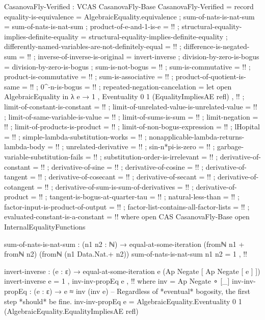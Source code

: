 \documentclass{report}
\begin{document}
\begin{code}
CasanovaFly-Verified : VCAS CasanovaFly-Base
CasanovaFly-Verified = record
  { equality-is-equivalence = AlgebraicEquality.equivalence
  ; sum-of-nats-is-nat-sum = sum-of-nats-is-nat-sum
  ; product-of-e-and-1-is-e = {!!}
  ; structural-equality-implies-definite-equality =
    structural-equality-implies-definite-equality
  ; differently-named-variables-are-not-definitely-equal = {!!}
  ; difference-is-negated-sum = {!!}
  ; inverse-of-inverse-is-original = invert-inverse
  ; division-by-zero-is-bogus = division-by-zero-is-bogus
  ; sum-is-not-bogus = {!!}
  ; sum-is-commutative = {!!}
  ; product-is-commutative = {!!}
  ; sum-is-associative = {!!}
  ; product-of-quotient-is-same = {!!}
  ; 0^-n-is-bogus = {!!}
  ; repeated-negation-cancelation =
    let open AlgebraicEquality in
    λ e → 1
        , Eventuality 0 1 (EqualityImpliesAE refl)
        , {!!}
  ; limit-of-constant-is-constant = {!!}
  ; limit-of-unrelated-value-is-unrelated-value = {!!}
  ; limit-of-same-variable-is-value = {!!}
  ; limit-of-sums-is-sum = {!!}
  ; limit-negation = {!!}
  ; limit-of-products-is-product = {!!}
  ; limit-of-non-bogus-expression = {!!}
  ; lHopital = {!!}
  ; simple-lambda-substitution-works = {!!}
  ; nonapplicable-lambda-returns-lambda-body = {!!}
  ; unrelated-derivative = {!!}
  ; sin-n*pi-is-zero = {!!}
  ; garbage-variable-substitution-fails = {!!}
  ; substitution-order-is-irrelevant = {!!}
  ; derivative-of-constant = {!!}
  ; derivative-of-sine = {!!}
  ; derivative-of-cosine = {!!}
  ; derivative-of-tangent = {!!}
  ; derivative-of-cosecant = {!!}
  ; derivative-of-secant = {!!}
  ; derivative-of-cotangent = {!!}
  ; derivative-of-sum-is-sum-of-derivatives = {!!}
  ; derivative-of-product = {!!}
  ; tangent-is-bogus-at-quarter-tau = {!!}
  ; natural-less-than = {!!}
  ; factor-input-is-product-of-output = {!!}
  ; factor-list-contains-all-factor-lists = {!!}
  ; evaluated-constant-is-a-constant = {!!}
  }
  where
  open CAS CasanovaFly-Base
  open InternalEqualityFunctions

  sum-of-nats-is-nat-sum :
    (n1 n2 : ℕ) →
    equal-at-some-iteration (fromℕ n1 + fromℕ n2) (fromℕ (n1 Data.Nat.+ n2))
  sum-of-nats-is-nat-sum n1 n2 = 1 , {!!}

  invert-inverse : (e : ε) → equal-at-some-iteration e (Ap Negate [ Ap Negate [ e ] ])
  invert-inverse e = 1 , inv-inv-propEq e , {!!}
    where
    inv = Ap Negate ∘ [_]
    inv-inv-propEq : (e : ε) → e ≈ inv (inv e)
    -- Regardless of *eventual* bogosity, the first step *should* be fine.
    inv-inv-propEq e = AlgebraicEquality.Eventuality 0 1 (AlgebraicEquality.EqualityImpliesAE refl)


\end{code}
\end{document}
